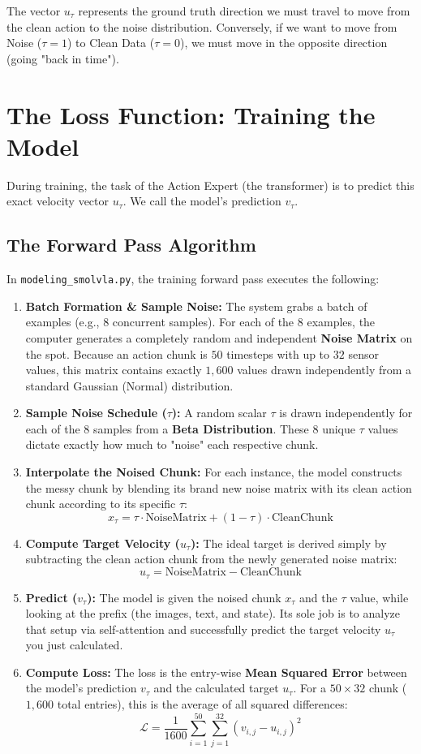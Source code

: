 \documentclass[11pt,a4paper]{article}
\begin{document}
The vector $u_\tau$ represents the ground truth direction we must travel to move from the clean action to the noise distribution. Conversely, if we want to move from Noise ($\tau=1$) to Clean Data ($\tau=0$), we must move in the opposite direction (going "back in time").

\section{The Loss Function: Training the Model}
During training, the task of the Action Expert (the transformer) is to predict this exact velocity vector $u_\tau$. We call the model's prediction $v_\tau$. 

\subsection{The Forward Pass Algorithm}
In \texttt{modeling\_smolvla.py}, the training forward pass executes the following:

\begin{enumerate}
    \item \textbf{Batch Formation \& Sample Noise:} The system grabs a batch of examples (e.g., $8$ concurrent samples). For each of the $8$ examples, the computer generates a completely random and independent \textbf{Noise Matrix} on the spot. Because an action chunk is $50$ timesteps with up to $32$ sensor values, this matrix contains exactly $1,600$ values drawn independently from a standard Gaussian (Normal) distribution.
    \item \textbf{Sample Noise Schedule ($\tau$):} A random scalar $\tau$ is drawn independently for each of the $8$ samples from a \textbf{Beta Distribution}. These $8$ unique $\tau$ values dictate exactly how much to "noise" each respective chunk.
    \item \textbf{Interpolate the Noised Chunk:} For each instance, the model constructs the messy chunk by blending its brand new noise matrix with its clean action chunk according to its specific $\tau$: 
    \[ x_\tau = \tau \cdot \text{NoiseMatrix} + (1 - \tau) \cdot \text{CleanChunk} \]
    \item \textbf{Compute Target Velocity ($u_\tau$):} The ideal target is derived simply by subtracting the clean action chunk from the newly generated noise matrix: 
    \[ u_\tau = \text{NoiseMatrix} - \text{CleanChunk} \]
    \item \textbf{Predict ($v_\tau$):} The model is given the noised chunk $x_\tau$ and the $\tau$ value, while looking at the prefix (the images, text, and state). Its sole job is to analyze that setup via self-attention and successfully predict the target velocity $u_\tau$ you just calculated.
    \item \textbf{Compute Loss:} The loss is the entry-wise \textbf{Mean Squared Error} between the model's prediction $v_\tau$ and the calculated target $u_\tau$. For a $50 \times 32$ chunk ($1,600$ total entries), this is the average of all squared differences:
    \[ \mathcal{L} = \frac{1}{1600} \sum_{i=1}^{50} \sum_{j=1}^{32} (v_{i,j} - u_{i,j})^2 \]
\end{enumerate}
\end{document}
